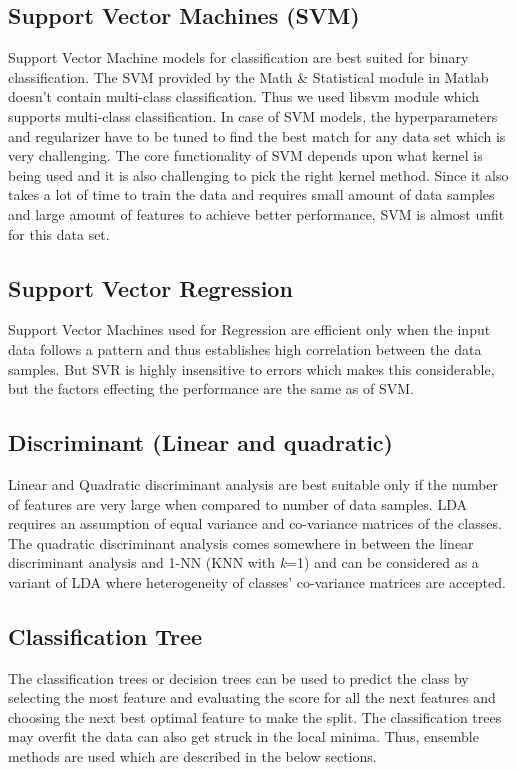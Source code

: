 \documentclass[journal, a4paper]{IEEEtran}
\begin{document}
\subsection{Support Vector Machines (SVM)}
Support Vector Machine models for classification are best suited for binary classification. The SVM provided by the Math \& Statistical module in Matlab doesn't contain multi-class classification. Thus we used libsvm module which supports multi-class classification. In case of SVM models, the hyperparameters and regularizer have to be tuned to find the best match for any data set which is very challenging. The core functionality of SVM depends upon what kernel is being used and it is also challenging to pick the right kernel method. Since it also takes a lot of time to train the data and requires small amount of data samples and large amount of features to achieve better performance, SVM is almost unfit for this data set.
\subsection{Support Vector Regression}
Support Vector Machines used for Regression are efficient only when the input data follows a pattern and thus establishes high correlation between the data samples. But SVR is highly insensitive to errors which makes this considerable, but the factors effecting the performance are the same as of SVM.
\subsection{Discriminant (Linear and quadratic)}
Linear and Quadratic discriminant analysis are best suitable only if the number of features are very large when compared to number of data samples. LDA requires an assumption of equal variance and co-variance matrices of the classes. The quadratic discriminant analysis comes somewhere in between the linear discriminant analysis and 1-NN (KNN with \textit{k}=1) and can be considered as a variant of LDA where heterogeneity of classes' co-variance matrices are accepted.
\subsection{Classification Tree}
The classification trees or decision trees can be used to predict the class by selecting the most feature and evaluating the score for all the next features and choosing the next best optimal feature to make the split. The classification trees may overfit the data can also get struck in the local minima. Thus, ensemble methods are used which are described in the below sections.
\end{document}
